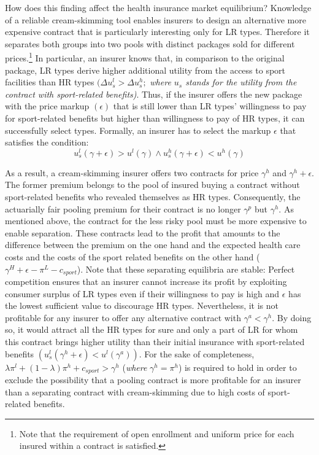 \documentclass[12pt,english]{article}%
\begin{document}
How does this finding affect the health insurance market equilibrium? Knowledge of a reliable cream-skimming tool enables insurers to design an alternative more expensive contract that is particularly interesting only for LR types. Therefore it separates both groups into two pools with distinct packages sold for different prices.\footnote{Note that the requirement of open enrollment and uniform price for each insured within a contract is satisfied.} In particular, an insurer knows that, in comparison to the original package, LR types derive higher additional utility from the access to sport facilities than HR types $(\Delta{u_s^l}>\Delta{u_s^h};$ \textit{where $u_s$ stands for the utility from the contract with sport-related benefits)}. Thus, if the insurer offers the new package with the price markup $(\epsilon)$ that is still lower than LR types' willingness to pay for sport-related benefits but higher than willingness to pay of HR types, it can successfully select types. Formally, an insurer has to select the markup $\epsilon$ that satisfies the condition:  $$ u_s^l(\gamma+\epsilon)>u^l(\gamma) \wedge u_s^h(\gamma+\epsilon)<u^h(\gamma)$$  

As a result, a cream-skimming insurer offers two contracts for price $\gamma^h$ and $\gamma^h+\epsilon$. The former premium belongs to the pool of insured buying a contract without sport-related benefits who revealed themselves as HR types. Consequently, the actuarially fair pooling premium for their contract is no longer $\gamma^p$ but $\gamma^h$. As mentioned above, the contract for the less risky pool must be more expensive to enable separation. These contracts lead to the profit that amounts to the difference between the premium on the one hand and the expected health care costs and the costs of the sport related benefits on the other hand ($\gamma^H+\epsilon-\pi^L-c_{sport}$). Note that these separating equilibria are stable: Perfect competition ensures that an insurer cannot increase its profit by exploiting consumer surplus of LR types even if their willingness to pay is high and $\epsilon$ has the lowest sufficient value to discourage HR types. Nevertheless, it is not profitable for any insurer to offer any alternative contract with $\gamma^a<\gamma^h$. By doing so, it would attract all the HR types for sure and only a part of LR for whom this contract brings higher utility than their initial insurance with sport-related benefits $(u_s^l(\gamma^h+\epsilon)<u^l(\gamma^a))$. For the sake of completeness, $\lambda\pi^l+(1-\lambda)\pi^h+c_{sport}>\gamma^h$ (\textit{where} $\gamma^h=\pi^h$) is required to hold in order to exclude the possibility that a pooling contract is more profitable for an insurer than a separating contract with cream-skimming due to high costs of sport-related benefits.
\end{document}
